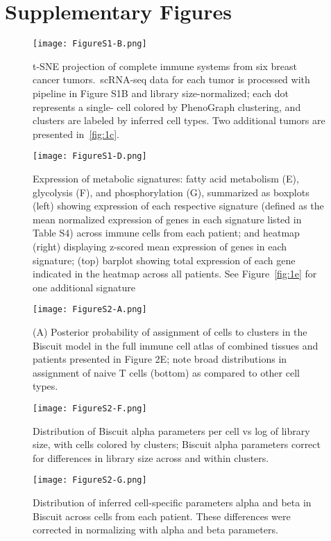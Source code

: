 
\chapter[Supplementary Figures][Supplementary Figures]{Supplementary Figures}

\begin{figure}
\centering
\texttt{[image: FigureS1-B.png]}
\caption{t-SNE projection of complete immune systems from six breast cancer tumors.\ scRNA-seq data for each tumor is processed with pipeline in Figure S1B and library size-normalized; each dot represents a single- cell colored by PhenoGraph clustering, and clusters are labeled by inferred cell types. Two additional tumors are presented in~\ref{fig:1c}.
}
\label{fig:s1b}
\end{figure}

\begin{figure}
\centering
\texttt{[image: FigureS1-D.png]}
\caption{Expression of metabolic signatures: fatty acid metabolism (E), glycolysis (F), and phosphorylation (G), summarized as boxplots (left) showing expression of each respective signature (defined as the mean normalized expression of genes in each signature listed in Table S4) across immune cells from each patient; and heatmap (right) displaying z-scored mean expression of genes in each signature; (top) barplot showing total expression of each gene indicated in the heatmap across all patients. See Figure~\ref{fig:1e} for one additional signature
}
\label{fig:s1d}
\end{figure}

\begin{figure}
\centering
\texttt{[image: FigureS2-A.png]}
\caption{(A) Posterior probability of assignment of cells to clusters in the Biscuit model in the full immune cell atlas of combined tissues and patients presented in Figure 2E; note broad distributions in assignment of naive T cells (bottom) as compared to other cell types.
}
\label{fig:s2a}
\end{figure}

\begin{figure}
\centering
\texttt{[image: FigureS2-F.png]}
\caption{Distribution of Biscuit alpha parameters per cell vs log of library size, with cells colored by clusters; Biscuit alpha parameters correct for differences in library size across and within clusters.
}
\label{fig:s2f}
\end{figure}

\begin{figure}
\centering
\texttt{[image: FigureS2-G.png]}
\caption{Distribution of inferred cell-specific parameters alpha and beta in Biscuit across cells from each patient. These differences were corrected in normalizing with alpha and beta parameters.
}
\label{fig:s2g}
\end{figure}

